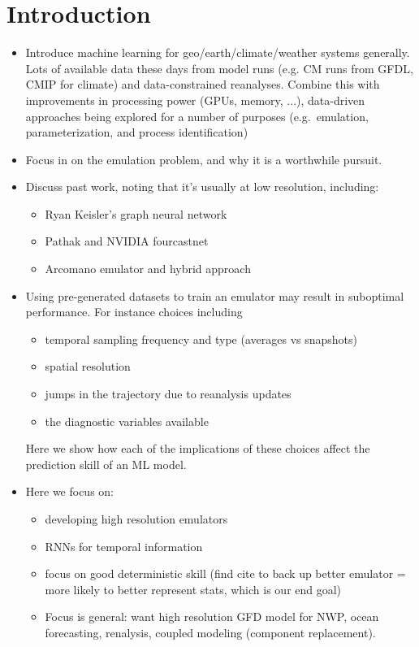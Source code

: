 \section{Introduction}
\label{sec:intro}

\begin{itemize}
    \item Introduce machine learning for geo/earth/climate/weather systems
        generally. Lots of available data these days from model runs (e.g. CM
        runs from GFDL, CMIP for climate) and data-constrained reanalyses.
        Combine this with
        improvements in processing power (GPUs, memory, ...), data-driven
        approaches being explored for a number of purposes (e.g.\ emulation,
        parameterization, and process identification)
    \item Focus in on the emulation problem, and why it is a worthwhile pursuit.
    \item Discuss past work, noting that it's usually at low resolution, including:
        \begin{itemize}
            \item Ryan Keisler's graph neural network
            \item Pathak and NVIDIA fourcastnet
            \item Arcomano emulator and hybrid approach
                \cite{arcomano_machine_2020}
        \end{itemize}
    \item Using pre-generated datasets to train an emulator may result in
        suboptimal performance. For instance choices including
        \begin{itemize}
            \item temporal sampling frequency and type (averages vs snapshots)
            \item spatial resolution
            \item jumps in the trajectory due to reanalysis updates
            \item the diagnostic variables available
        \end{itemize}
        Here we show how each of the implications of these choices affect the
        prediction skill of an ML model.
    \item Here we focus on:
        \begin{itemize}
            \item developing high resolution emulators
            \item RNNs for temporal information
            \item focus on good deterministic skill (find cite to
                back up better emulator = more likely to better represent
                stats, which is our end goal)
            \item Focus is general: want high resolution GFD model for NWP,
                ocean forecasting, renalysis, coupled modeling (component replacement).
        \end{itemize}
\end{itemize}


